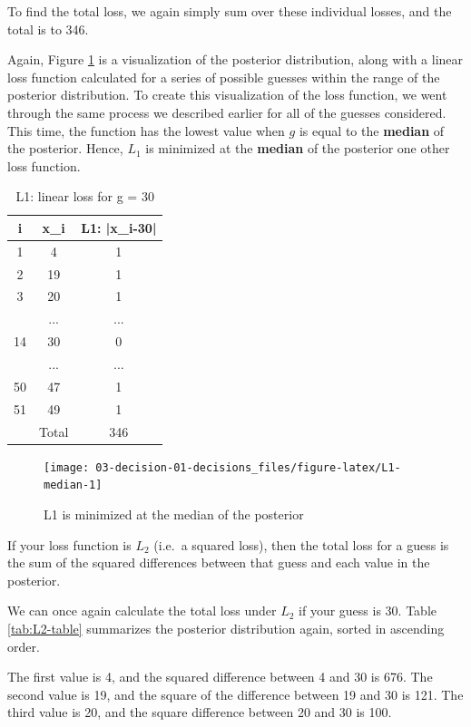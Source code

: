 \documentclass[]{book}
\theoremstyle{definition}
\theoremstyle{definition}
\theoremstyle{definition}
\theoremstyle{remark}
\begin{document}
To find the total loss, we again simply sum over these individual
losses, and the total is to 346.

Again, Figure \ref{fig:L1-median} is a visualization of the posterior
distribution, along with a linear loss function calculated for a series
of possible guesses within the range of the posterior distribution. To
create this visualization of the loss function, we went through the same
process we described earlier for all of the guesses considered. This
time, the function has the lowest value when \(g\) is equal to the
\textbf{median} of the posterior. Hence, \(L_1\) is minimized at the
\textbf{median} of the posterior one other loss function.

\begin{table}

\caption{\label{tab:L1-table}L1: linear loss for g = 30}
\centering
\begin{tabular}[t]{ccc}
\toprule
i & x\_i & L1: |x\_i-30|\\
\midrule
1 & 4 & 1\\
2 & 19 & 1\\
3 & 20 & 1\\
 & ... & ...\\
14 & 30 & 0\\
\addlinespace
 & ... & ...\\
50 & 47 & 1\\
51 & 49 & 1\\
 & Total & 346\\
\bottomrule
\end{tabular}
\end{table}

\begin{figure}

{\centering \texttt{[image: 03-decision-01-decisions\_files/figure-latex/L1-median-1]} 

}

\caption{L1 is minimized at the median of the posterior}\label{fig:L1-median}
\end{figure}

If your loss function is \(L_2\) (i.e.~a squared loss), then the total
loss for a guess is the sum of the squared differences between that
guess and each value in the posterior.

We can once again calculate the total loss under \(L_2\) if your guess
is 30. Table \ref{tab:L2-table} summarizes the posterior distribution
again, sorted in ascending order.

The first value is 4, and the squared difference between 4 and 30 is
676. The second value is 19, and the square of the difference between 19
and 30 is 121. The third value is 20, and the square difference between
20 and 30 is 100.
\end{document}
